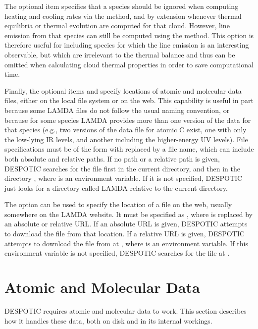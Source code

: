 \documentclass[letterpaper,10pt,english]{sphinxmanual}
\begin{document}
The optional item  specifies that a species should be
ignored when computing heating and cooling rates via the
 method, and by extension whenever thermal equilibria or
thermal evolution are computed for that cloud. However, line emission
from that species can still be computed using the 
method. This option is therefore useful for including species for
which the line emission is an interesting observable, but which are
irrelevant to the thermal balance and thus can be omitted when
calculating cloud thermal properties in order to save computational
time.

Finally, the optional items  and  specify
locations of atomic and molecular data files, either on the local file
system or on the web. This capability is useful in part because some
LAMDA files do not follow the usual naming convention, or because for
some species LAMDA provides more than one version of the data for that
species (e.g., two versions of the data file for atomic C exist, one
with only the low-lying IR levels, and another including the
higher-energy UV levels). File specifications must be of the form
 with  replaced by a file name, which can include
both absolute and relative paths. If no path or a relative path is
given, DESPOTIC searches for the file first in the current directory,
and then in the directory , where
 is an environment variable. If it is not specified,
DESPOTIC just looks for a directory called LAMDA relative to the
current directory.

The  option can be used to specify the location of a file
on the web, usually somewhere on the LAMDA website. It must be
specified as , where  is replaced by an absolute or
relative URL. If an absolute URL is given, DESPOTIC attempts to
download the file from that location. If a relative URL is given,
DESPOTIC attempts to download the file from at
, where
 is an environment variable. If this environment
variable is not specified, DESPOTIC searches for the file at
.


\chapter{Atomic and Molecular Data}
\label{data:sec-data}\label{data:atomic-and-molecular-data}\label{data::doc}
DESPOTIC requires atomic and molecular data to work. This section
describes how it handles these data, both on disk and in its internal
workings.
\end{document}
